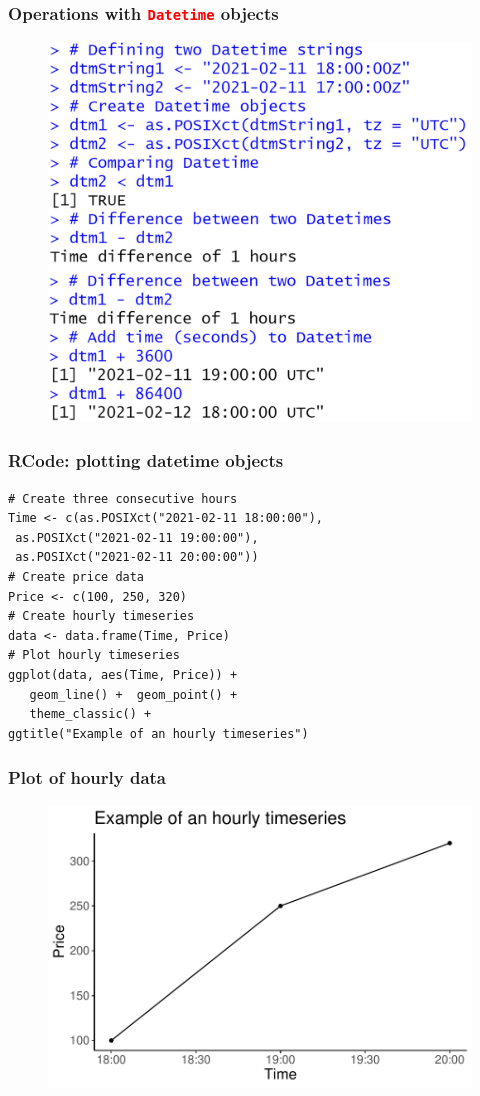 \documentclass{beamer}
\begin{document}
\begin{frame}\frametitle{Operations with \texttt{\textcolor{red}{Datetime}} objects}
\begin{figure}
\includegraphics[width=0.85\linewidth]{PlotsLec4/DatetimeOperations}
\end{figure}
\end{frame}

\begin{frame}[fragile]\frametitle{RCode: plotting datetime objects}
\begin{lstlisting}
# Create three consecutive hours
Time <- c(as.POSIXct("2021-02-11 18:00:00"),
 as.POSIXct("2021-02-11 19:00:00"),
 as.POSIXct("2021-02-11 20:00:00"))
# Create price data
Price <- c(100, 250, 320)
# Create hourly timeseries
data <- data.frame(Time, Price)
# Plot hourly timeseries
ggplot(data, aes(Time, Price)) +
   geom_line() +  geom_point() +
   theme_classic() +
ggtitle("Example of an hourly timeseries")
\end{lstlisting}
\end{frame}

\begin{frame}\frametitle{Plot of hourly data}
\begin{figure}
\includegraphics[width=0.99\linewidth]{PlotsLec4/HourlySeries}
\end{figure}
\end{frame}
\end{document}
